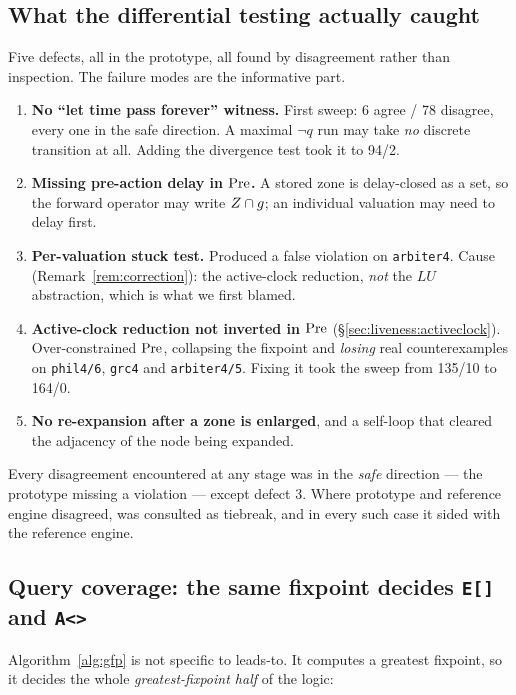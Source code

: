 \subsection{What the differential testing actually caught}
\label{sec:eval:bugs}

Five defects, all in the prototype, all found by disagreement rather than inspection. The failure
modes are the informative part.

\begin{enumerate}
  \item \textbf{No ``let time pass forever'' witness.} First sweep: 6 agree / 78 disagree, every one
        in the safe direction. A maximal $\lnot q$ run may take \emph{no} discrete transition at
        all. Adding the divergence test took it to 94/2.
  \item \textbf{Missing pre-action delay in $\mathrm{Pre}$.} A stored zone is delay-closed as a set, so the
        forward operator may write $Z \cap g$; an individual valuation may need to delay first.
  \item \textbf{Per-valuation stuck test.} Produced a false violation on \texttt{arbiter4}. Cause
        (Remark~\ref{rem:correction}): the active-clock reduction, \emph{not} the $LU$ abstraction,
        which is what we first blamed.
  \item \textbf{Active-clock reduction not inverted in $\mathrm{Pre}$}
        (\S\ref{sec:liveness:activeclock}). Over-constrained $\mathrm{Pre}$, collapsing the fixpoint and
        \emph{losing} real counterexamples on \texttt{phil4/6}, \texttt{grc4} and
        \texttt{arbiter4/5}. Fixing it took the sweep from 135/10 to 164/0.
  \item \textbf{No re-expansion after a zone is enlarged}, and a self-loop that cleared the
        adjacency of the node being expanded.
\end{enumerate}

Every disagreement encountered at any stage was in the \emph{safe} direction --- the prototype
missing a violation --- except defect 3. Where prototype and reference engine disagreed,
\verifyta{} was consulted as tiebreak, and in every such case it sided with the reference engine.

\subsection{Query coverage: the same fixpoint decides \texttt{E[]} and \texttt{A<>}}
\label{sec:eval:coverage}

Algorithm~\ref{alg:gfp} is not specific to leads-to. It computes a greatest fixpoint, so it decides
the whole \emph{greatest-fixpoint half} of the logic:

